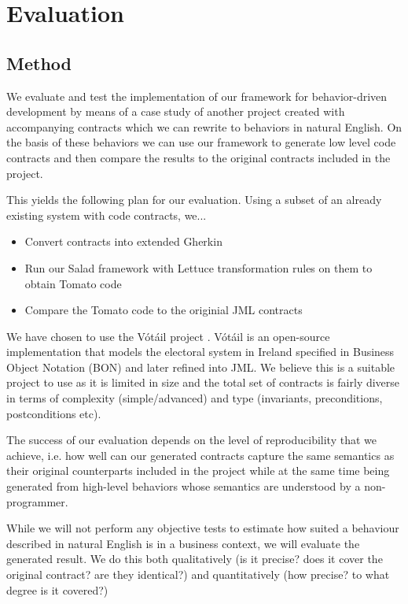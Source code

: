 \section{Evaluation}
\subsection{Method}

We evaluate and test the implementation of our framework for behavior-driven development by means of a case study of another project created with accompanying contracts which we can rewrite to behaviors in natural English. On the basis of these behaviors we can use our framework to generate low level code contracts and then compare the results to the original contracts included in the project.
 
This yields the following plan for our evaluation. Using a subset of an already existing system with code contracts, we...

\begin{itemize}
	\item Convert contracts into extended Gherkin
	\item Run our Salad framework with Lettuce transformation rules on them to obtain Tomato code
	\item Compare the Tomato code to the originial JML contracts
\end{itemize}

We have chosen to use the V\'{o}t\'{a}il project \cite{votailCochranKiniry}. V\'{o}t\'{a}il is an open-source implementation that models the electoral system in Ireland specified in Business Object Notation (BON) \cite{bonmethod} and later refined into JML. We believe this is a suitable project to use as it is limited in size and the total set of contracts is fairly diverse in terms of complexity (simple/advanced) and type (invariants, preconditions, postconditions etc).

The success of our evaluation depends on the level of reproducibility that we achieve, i.e. how well can our generated contracts capture the same semantics as their original counterparts included in the project while at the same time being generated from high-level behaviors whose semantics are understood by a non-programmer.
 
While we will not perform any objective tests to estimate how suited a behaviour described in natural English is in a business context, we will evaluate the generated result. We do this both qualitatively (is it precise? does it cover the original contract? are they identical?) and quantitatively (how precise? to what degree is it covered?)
 
